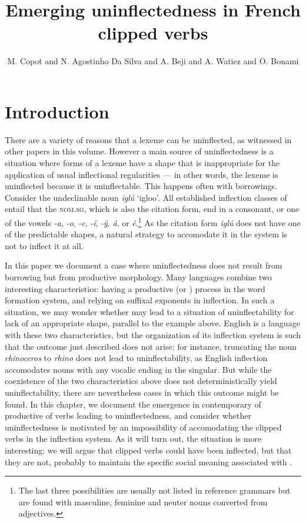 \documentclass[output=paper,colorlinks,citecolor=brown]{langscibook}
\author{M. Copot\orcid{0000-0001-5182-9482}\affiliation{Surrey Morphology Group, University of Surrey} and N. Agostinho Da Silva\orcid{}\affiliation{} and A. Beji\orcid{}\affiliation{} and A. Watiez\orcid{}\affiliation{} and O. Bonami\orcid{0000-0003-0688-3855}\affiliation{Université Paris Cité, CNRS, Laboratoire de Linguistique Formelle}}
\title{Emerging uninflectedness in French clipped verbs}
\begin{document}
\maketitle

\section{Introduction} 

There are a variety of reasons that a lexeme can be uninflected, as witnessed in other papers in this volume. However a main source of uninflectedness is a situation where forms of a lexeme have a shape that is inappropriate for the application of usual inflectional regularities --- in other words, the lexeme is uninflected because it is uninflectable. This happens often with borrowings. Consider the  undeclinable noun \emph{iglú} ‘igloo’. All established inflection classes of  entail that the \textsc{nom.sg}, which is also the citation form, end in a consonant, or one of the vowels \emph{-a}, \emph{-o}, \emph{-e}, \emph{-í}, \emph{-ý}, \emph{á}, or \emph{é}.\footnote{The last three possibilities are usually not listed in reference grammars but are found with masculine, feminine and neuter nouns converted from adjectives.} As the citation form \emph{iglú} does not have one of the predictable shapes, a natural strategy to accomodate it in the system is not to inflect it at all.

In this paper we document a case where uninflectedness does not result from borrowing but from productive morphology. Many languages combine two interesting characteristics: having a productive  (or ) process in the word formation system, and relying on suffixal exponents in inflection. In such a situation, we may wonder whether  may lead to a situation of uninflectability for lack of an appropriate shape, parallel to the  example above. English is a language with these two characteristics, but the organization of its inflection system is such that the outcome just described does not arise: for instance, truncating the noun \emph{rhinoceros} to \emph{rhino} does not lead to uninflectability, as English inflection accomodates nouns with any vocalic ending in the singular. But while the coexistence of the two characteristics above does not deterministically yield uninflectability, there are nevertheless cases in which this outcome might be found. In this chapter, we document the emergence in contemporary  of productive  of verbs leading to uninflectedness, and consider whether uninflectedness is motivated by an impossibility of accomodating the clipped verbs in the inflection system. As it will turn out, the situation is more interesting: we will argue that  clipped verbs could have been inflected, but that they are not, probably to maintain the specific social meaning associated with .
\end{document}
